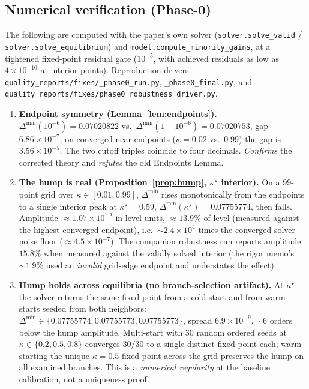\subsection*{Numerical verification (Phase-0)}
\label{sec:numverify}

The following are computed with the paper's own solver
(\texttt{solver.solve\_valid} / \texttt{solver.solve\_equilibrium}) and
\texttt{model.compute\_minority\_gains}, at a tightened fixed-point residual
gate ($10^{-5}$, with achieved residuals as low as $4\times10^{-10}$ at
interior points). Reproduction drivers:
\texttt{quality\_reports/fixes/\_phase0\_run.py},
\texttt{\_phase0\_final.py}, and
\texttt{quality\_reports/fixes/phase0\_robustness\_driver.py}.

\begin{enumerate}
\item \textbf{Endpoint symmetry (Lemma~\ref{lem:endpoints}).}
$\Delta^{\min}(10^{-6})=0.07020822$ vs.\ $\Delta^{\min}(1-10^{-6})=0.07020753$,
gap $6.86\times10^{-7}$; on converged near-endpoints
($\kappa=0.02$ vs.\ $0.99$) the gap is $3.56\times10^{-5}$. The two cutoff
triples coincide to four decimals. \emph{Confirms} the corrected theory and
\emph{refutes} the old Endpoints Lemma.

\item \textbf{The hump is real (Proposition~\ref{prop:hump}, $\kappa^\star$
interior).} On a 99-point grid over $\kappa\in[0.01,0.99]$, $\Delta^{\min}$
rises monotonically from the endpoints to a single interior peak at
$\kappa^\star=0.59$, $\Delta^{\min}(\kappa^\star)=0.07755774$, then falls.
Amplitude $\approx1.07\times10^{-2}$ in level units, $\approx13.9\%$ of level
(measured against the highest converged endpoint), i.e.\ $\sim\!2.4\times10^{4}$
times the converged solver-noise floor ($\approx4.5\times10^{-7}$). The
companion robustness run reports amplitude $15.8\%$ when measured against the
validly solved interior (the rigor memo's $\sim\!1.9\%$ used an
\emph{invalid} grid-edge endpoint and understates the effect).

\item \textbf{Hump holds across equilibria (no branch-selection artifact).} At
$\kappa^\star$ the solver returns the same fixed point from a cold start and
from warm starts seeded from both neighbors: $\Delta^{\min}\in
\{0.07755774,0.07755773,0.07755773\}$, spread $6.9\times10^{-9}$,
$\sim\!6$ orders below the hump amplitude. Multi-start with 30 random ordered
seeds at $\kappa\in\{0.2,0.5,0.8\}$ converges $30/30$ to a single distinct
fixed point each; warm-starting the unique $\kappa=0.5$ fixed point across the
grid preserves the hump on all examined branches. This is a \emph{numerical
regularity} at the baseline calibration, not a uniqueness proof.


\end{enumerate}
